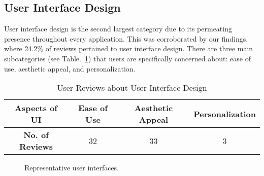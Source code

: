 \documentclass[conference,10pt]{IEEEtran}
\begin{document}
\subsection{User Interface Design}
User interface design is the second largest category due to its permeating presence throughout every application. This was corroborated by our findings, where 24.2\% of reviews pertained to user interface design. There are three main subcategories (see Table.~\ref{tab:UI}) that users are specifically concerned about: ease of use, aesthetic appeal, and personalization.

\begin{table}[ht]
  \caption{User Reviews about User Interface Design}\label{tab:UI}\vspace{-2mm}
\begin{center}
  \begin{tabular}{ c | c | c | c } \hline
{\bf Aspects of UI} & Ease of Use & Aesthetic Appeal & Personalization \\ \hline
{\bf No. of Reviews} & 32 & 33 & 3 \\ \hline
  \end{tabular}
\end{center}
\end{table}

\begin{figure*}[t]
\centering
{}\hfil
{}\hfil
{}
\caption{Representative user interfaces.}\label{fig:personUI}
\end{figure*}
\end{document}
